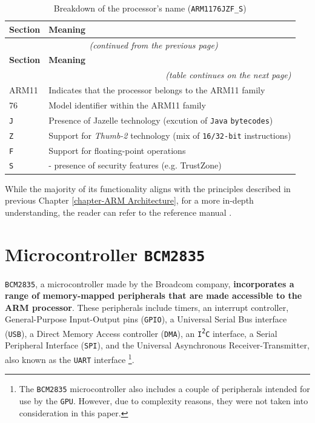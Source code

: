 \documentclass[english, ing, kiv, he, iso690numb, pdf]{fasthesis}
\begin{document}
	\begin{center}
		\begin{longtable}{p{}p{}}
			\caption{Breakdown of the processor's name (\texttt{ARM1176JZF\_S})}
			\label{Breakdown of the processor's name}\\
			\toprule[1.5pt]
			\textbf{Section} & \textbf{Meaning}\\
			\midrule
			\endfirsthead
			\multicolumn{2}{c}{\tablename{}~\thetable{} \textit{(continued from the previous page)}}\\
			\midrule
			\textbf{Section} & \textbf{Meaning}\\
			\midrule
			\endhead
			\midrule
			\multicolumn{2}{r}{\textit{(table continues on the next page)}}\\
			\endfoot
			\bottomrule[1.5pt]
			\endlastfoot
			ARM11 & Indicates that the processor belongs to the ARM11 family \\
			76 & Model identifier within the ARM11 family \\
			\texttt{J} & Presence of Jazelle technology (excution of \texttt{Java} \texttt{bytecodes}) \\
			\texttt{Z} & Support for \textit{Thumb-2} technology (mix of \texttt{16/32-bit} instructions)\\
			\texttt{F} & Support for floating-point operations \\
			\texttt{S} & \say{Secure} - presence of security features (e.g. TrustZone)\\
		\end{longtable}
	\end{center}
	
	While the majority of its functionality aligns with the principles described in previous Chapter \ref{chapter-ARM Architecture}, for a more in-depth understanding, the reader can refer to the reference manual \cite{ARM1176JZF-S}.  
	
	\section{Microcontroller \texttt{BCM2835}}
	
	\texttt{BCM2835}, a microcontroller made by the Broadcom company, \textbf{incorporates a range of memory-mapped peripherals that are made accessible to the ARM processor}. These peripherals include timers, an interrupt controller, General-Purpose Input-Output pins (\texttt{GPIO}), a Universal Serial Bus interface (\texttt{USB}), a Direct Memory Access controller (\texttt{DMA}), an \texttt{I\textsuperscript{2}C} interface, a Serial Peripheral Interface (\texttt{SPI}), and the Universal Asynchronous Receiver-Transmitter, also known as the \texttt{UART} interface \footnote{The \texttt{BCM2835} microcontroller also includes a couple of peripherals intended for use by the \texttt{GPU}. However, due to complexity reasons, they were not taken into consideration in this paper.}.
	
\end{document}
